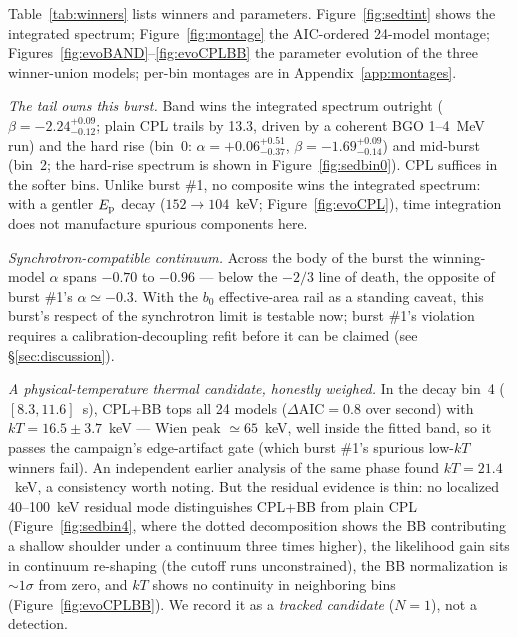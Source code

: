 \documentclass[twocolumn]{aastex631}
\begin{document}
Table~\ref{tab:winners} lists winners and parameters.
Figure~\ref{fig:sedtint} shows the integrated spectrum;
Figure~\ref{fig:montage} the AIC-ordered 24-model montage;
Figures~\ref{fig:evoBAND}--\ref{fig:evoCPLBB} the parameter evolution of the
three winner-union models; per-bin montages are in
Appendix~\ref{app:montages}.

\textit{The tail owns this burst.} Band wins the integrated spectrum
outright ($\beta = -2.24^{+0.09}_{-0.12}$; plain CPL trails by 13.3, driven
by a coherent BGO 1--4~MeV run) and the hard rise (bin~0:
$\alpha = +0.06^{+0.51}_{-0.37}$, $\beta = -1.69^{+0.09}_{-0.14}$) and
mid-burst (bin~2; the hard-rise spectrum is shown in
Figure~\ref{fig:sedbin0}). CPL suffices in the softer bins. Unlike burst \#1, no
composite wins the integrated spectrum: with a gentler $E_{\rm p}$ decay
($152 \rightarrow 104$~keV; Figure~\ref{fig:evoCPL}), time integration does
not manufacture spurious components here.

\textit{Synchrotron-compatible continuum.} Across the body of the burst the winning-model
$\alpha$ spans $-0.70$ to $-0.96$ --- below the $-2/3$ line of death,
the opposite of burst \#1's $\alpha \simeq -0.3$. With the $b_0$
effective-area rail as a standing caveat, this burst's respect of the
synchrotron limit is testable now; burst \#1's violation requires a
calibration-decoupling refit before it can be claimed (see
\S\ref{sec:discussion}).

\textit{A physical-temperature thermal candidate, honestly weighed.} In the
decay bin~4 ($[8.3, 11.6]$~s), CPL+BB tops all 24 models
($\Delta\mathrm{AIC} = 0.8$ over second) with $kT = 16.5 \pm 3.7$~keV ---
Wien peak $\simeq 65$~keV, well inside the fitted band, so it passes the
campaign's edge-artifact gate (which burst \#1's spurious low-$kT$ winners
fail). An independent earlier analysis of the same phase found
$kT = 21.4$~keV, a consistency worth noting. But the residual evidence is
thin: no localized 40--100~keV residual mode distinguishes CPL+BB from plain
CPL (Figure~\ref{fig:sedbin4}, where the dotted decomposition shows the BB
contributing a shallow shoulder under a continuum three times higher), the
likelihood gain sits in continuum re-shaping (the cutoff runs unconstrained),
the BB normalization is $\sim 1\sigma$ from zero, and $kT$ shows no
continuity in neighboring bins (Figure~\ref{fig:evoCPLBB}). We record it as
a \emph{tracked candidate} ($N = 1$), not a detection.
\end{document}
